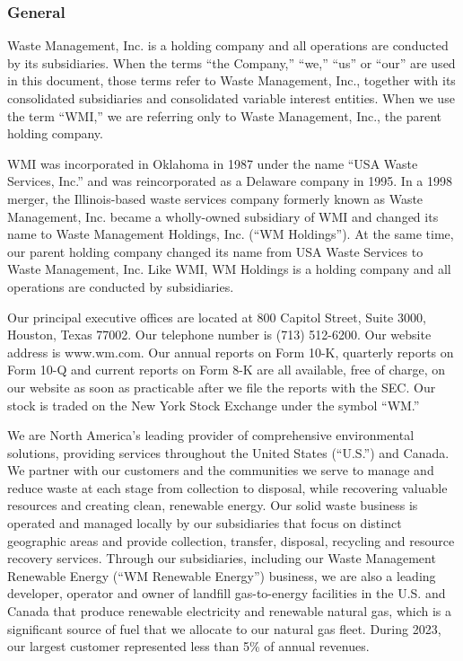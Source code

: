 \documentclass{article}
\begin{document}
\subsubsection{General}
Waste Management, Inc. is a holding company and all operations are conducted by its subsidiaries. When the terms “the Company,” “we,” “us” or “our” are used in this document, those terms refer to Waste Management, Inc., together with its consolidated subsidiaries and consolidated variable interest entities. When we use the term “WMI,” we are referring only to Waste Management, Inc., the parent holding company.

WMI was incorporated in Oklahoma in 1987 under the name “USA Waste Services, Inc.” and was reincorporated as a Delaware company in 1995. In a 1998 merger, the Illinois-based waste services company formerly known as Waste Management, Inc. became a wholly-owned subsidiary of WMI and changed its name to Waste Management Holdings, Inc. (“WM Holdings”). At the same time, our parent holding company changed its name from USA Waste Services to Waste Management, Inc. Like WMI, WM Holdings is a holding company and all operations are conducted by subsidiaries.

Our principal executive offices are located at 800 Capitol Street, Suite 3000, Houston, Texas 77002. Our telephone number is (713) 512-6200. Our website address is www.wm.com. Our annual reports on Form 10-K, quarterly reports on Form 10-Q and current reports on Form 8-K are all available, free of charge, on our website as soon as practicable after we file the reports with the SEC. Our stock is traded on the New York Stock Exchange under the symbol “WM.”

We are North America’s leading provider of comprehensive environmental solutions, providing services throughout the United States (“U.S.”) and Canada. We partner with our customers and the communities we serve to manage and reduce waste at each stage from collection to disposal, while recovering valuable resources and creating clean, renewable energy. Our solid waste business is operated and managed locally by our subsidiaries that focus on distinct geographic areas and provide collection, transfer, disposal, recycling and resource recovery services. Through our subsidiaries, including our Waste Management Renewable Energy (“WM Renewable Energy”) business, we are also a leading developer, operator and owner of landfill gas-to-energy facilities in the U.S. and Canada that produce renewable electricity and renewable natural gas, which is a significant source of fuel that we allocate to our natural gas fleet. During 2023, our largest customer represented less than 5\% of annual revenues.
\end{document}
